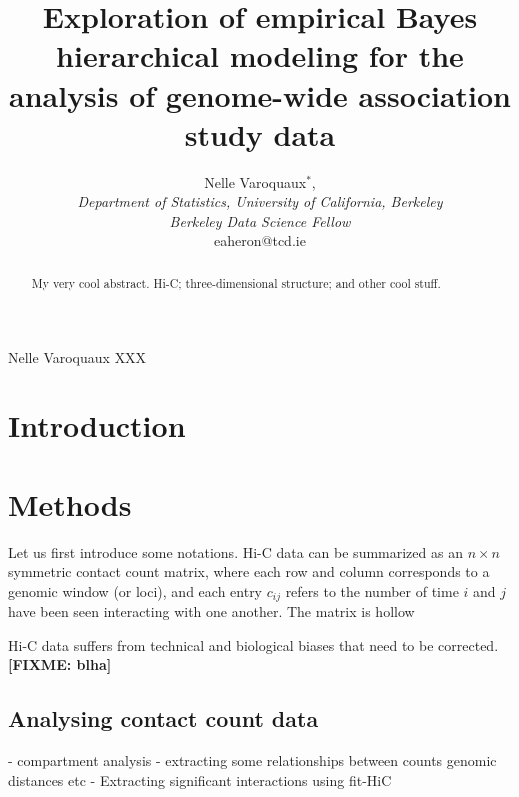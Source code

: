 \documentclass[oupdraft]{bio}
\newcommand{\fixme}[1]{\textbf{[FIXME: #1]}}
\begin{document}
\title{Exploration of empirical Bayes hierarchical modeling for the
analysis of genome-wide association study data}

\author{Nelle Varoquaux$^\ast$,\\[4pt]
\textit{Department of Statistics, University of California, Berkeley \\
Berkeley Data Science Fellow}
\\[2pt]
{eaheron@tcd.ie}}

\markboth%
{Nelle Varoquaux}
{XXX}

\maketitle


\begin{abstract}
{My very cool abstract.}
{Hi-C; three-dimensional structure; and other cool stuff.
}
\end{abstract}


\section{Introduction}
\label{sec1}


\section{Methods}
\label{sec2}

Let us first introduce some notations. Hi-C data can be summarized as an $n
\times n$ symmetric contact count matrix, where each row and column corresponds to a
genomic window (or loci), and each entry $c_{ij}$ refers to the number of time
$i$ and $j$ have been seen interacting with one another. The matrix is hollow

Hi-C data suffers from technical and biological biases that need to be
corrected. \fixme{blha} 


\subsection{Analysing contact count data}
- compartment analysis
- extracting some relationships between counts genomic distances etc
- Extracting significant interactions using fit-HiC
\end{document}
